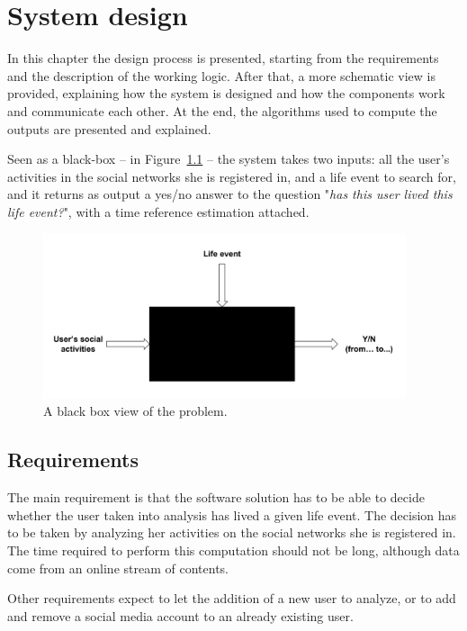 \chapter{System design}
\label{cha:design}
In this chapter the design process is presented, starting from the requirements and the description of the working logic. After that, a more schematic view is provided, explaining how the system is designed and how the components work and communicate each other. At the end, the algorithms used to compute the outputs are presented and explained.

Seen as a black-box -- in Figure~\ref{fig:bb} -- the system takes two inputs: all the user's activities in the social networks she is registered in, and a life event to search for, and it returns as output a yes/no answer to the question "\textit{has this user lived this life event?}", with a time reference estimation attached.

\begin{figure}[H]
\centering
\includegraphics[width=%
0.95\textwidth]{img/bb}
\caption{A black box view of the problem.}
\label{fig:bb}
\end{figure}

\section{Requirements}

The main requirement is that the software solution has to be able to decide whether the user taken into analysis has lived a given life event. The decision has to be taken by analyzing her activities on the social networks she is registered in. The time required to perform this computation should not be long, although data come from an online stream of contents.

Other requirements expect to let the addition of a new user to analyze, or to add and remove a social media account to an already existing user.

